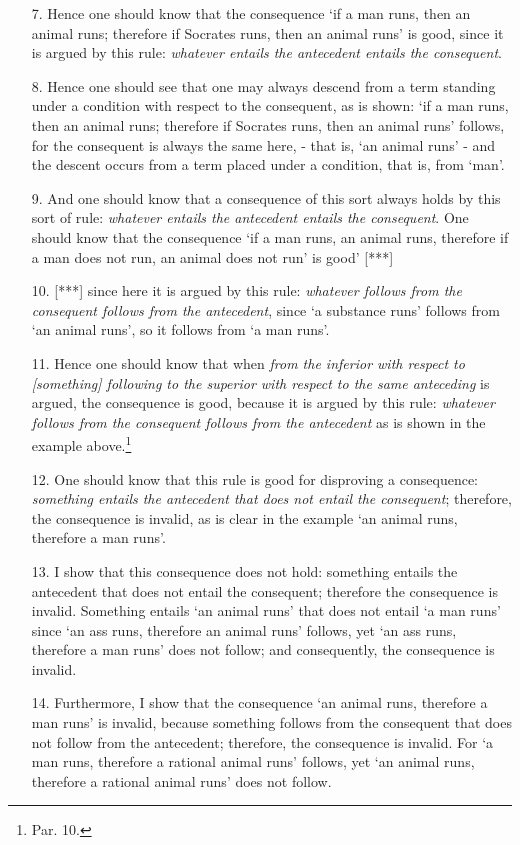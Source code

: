 \begin{enumerate}
\item[7.] Hence one should know that the consequence `if a man runs, then an animal runs; therefore if Socrates runs, then an animal runs' is good, since it is argued by this rule: \textit{whatever entails the antecedent entails the consequent}.
\item[8.] Hence one should see that one may always descend from a term standing under a condition with respect to the consequent, as is shown: `if a man runs, then an animal runs; therefore if Socrates runs, then an animal runs' follows, for the consequent is always the same here, - that is, `an animal runs' - and the descent occurs from a term placed under a condition, that is, from `man'.
\item[9.] And one should know that a consequence of this sort always holds by this sort of rule: \textit{whatever entails the antecedent entails the consequent}. One should know that the consequence `if a man runs, an animal runs, therefore if a man does not run, an animal does not run' is good' [***]
\item[10.] [***] since here it is argued by this rule: \textit{whatever follows from the consequent follows from the antecedent}, since `a substance runs' follows from `an animal runs', so it follows from `a man runs'. 
\item[11.] Hence one should know that when \textit{from the inferior with respect to [something] following to the superior with respect to the same anteceding} is argued, the consequence is good, because it is argued by this rule: \textit{whatever follows from the consequent follows from the antecedent} as is shown in the example above.\footnote{Par. 10.}
\item[12.] One should know that this rule is good for disproving a consequence: \textit{something entails the antecedent that does not entail the consequent}; therefore, the consequence is invalid, as is clear in the example `an animal runs, therefore a man runs'.
\item[13.] I show that this consequence does not hold: something entails the antecedent that does not entail the consequent; therefore the consequence is invalid. Something entails `an animal runs' that does not entail `a man runs' since `an ass runs, therefore an animal runs' follows, yet `an ass runs, therefore a man runs' does not follow; and consequently, the consequence is invalid.
\item[14.] Furthermore, I show that the consequence `an animal runs, therefore a man runs' is invalid, because something follows from the consequent that does not follow from the antecedent; therefore, the consequence is invalid. For `a man runs, therefore a rational animal runs' follows, yet `an animal runs, therefore a rational animal runs' does not follow.

\end{enumerate}

